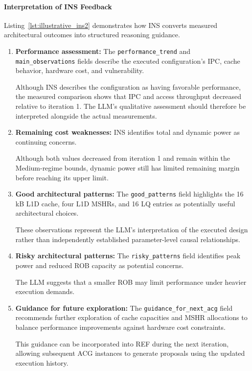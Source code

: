 \paragraph{Interpretation of INS Feedback}

Listing~\ref{lst:illustrative_ins2}
demonstrates how INS converts measured
architectural outcomes into structured
reasoning guidance.

\begin{enumerate}

\item \textbf{Performance assessment:}
The \texttt{performance\_trend} and
\texttt{main\_observations} fields describe
the executed configuration's IPC, cache
behavior, hardware cost, and vulnerability.

Although INS describes the configuration
as having favorable performance, the
measured comparison shows that IPC and
access throughput decreased relative to
iteration 1. The LLM's qualitative
assessment should therefore be interpreted
alongside the actual measurements.

\item \textbf{Remaining cost weaknesses:}
INS identifies total and dynamic power
as continuing concerns.

Although both values decreased from
iteration 1 and remain within the
Medium-regime bounds, dynamic power
still has limited remaining margin
before reaching its upper limit.

\item \textbf{Good architectural patterns:}
The \texttt{good\_patterns} field highlights
the 16 kB L1D cache, four L1D MSHRs,
and 16 LQ entries as potentially useful
architectural choices.

These observations represent the LLM's
interpretation of the executed design
rather than independently established
parameter-level causal relationships.

\item \textbf{Risky architectural patterns:}
The \texttt{risky\_patterns} field identifies
peak power and reduced ROB capacity
as potential concerns.

The LLM suggests that a smaller ROB
may limit performance under heavier
execution demands.

\item \textbf{Guidance for future exploration:}
The \texttt{guidance\_for\_next\_acg}
field recommends further exploration
of cache capacities and MSHR allocations
to balance performance improvements
against hardware cost constraints.

This guidance can be incorporated into
REF during the next iteration, allowing
subsequent ACG instances to generate
proposals using the updated execution
history.

\end{enumerate}


